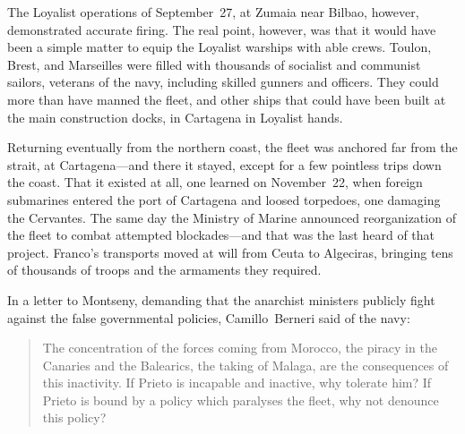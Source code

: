 The Loyalist operations of September~27, at Zumaia near Bilbao, however, demonstrated accurate firing. The real point, however, was that it would have been a simple matter to equip the Loyalist warships with able crews. Toulon, Brest, and Marseilles were filled with thousands of socialist and communist sailors, veterans of the navy, including skilled gunners and officers. They could more than have manned the fleet, and other ships that could have been built at the main construction docks, in Cartagena in Loyalist hands.

Returning eventually from the northern coast, the fleet was anchored far from the strait, at Cartagena---and there it stayed, except for a few pointless trips down the coast. That it existed at all, one learned on November~22, when foreign submarines entered the port of Cartagena and loosed torpedoes, one damaging the Cervantes. The same day the Ministry of Marine announced reorganization of the fleet to combat attempted blockades---and that was the last heard of that project. Franco’s transports moved at will from Ceuta to Algeciras, bringing tens of thousands of troops and the armaments they required.

In a letter to Montseny, demanding that the anarchist ministers publicly fight against the false governmental policies, Camillo~Ber\-neri said of the navy:

\indexIPrieto{}
\begin{quotation}
  The concentration of the forces coming from Morocco, the piracy in the Canaries and the Balearics, the taking of Malaga, are the consequences of this inactivity. If Prieto is incapable and inactive, why tolerate him? If Prieto is bound by a policy which paralyses the fleet, why not denounce this policy?
\end{quotation}

